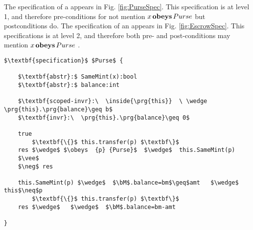
The specification of  a  appears in Fig. \ref{fig:PurseSpec}. This specification is at level 1, and therefore pre-conditions for not mention $x\, \textbf{obeys} \, Purse$ but postconditions do.
The specification of  an   appears in Fig. \ref{fig:EscrowSpec}. This specifications is at level 2, and therefore both pre- and post-conditions may mention  $x\, \textbf{obeys} \, Purse$ .

\newcommand{\sMT}{sellerM} 
\newcommand{\bMT}{buyerM}
\newcommand{\sGT}{sellerG} 
\newcommand{\bGT}{buyerG}
\newcommand{\sM}{\prg{\sMT}}
\newcommand{\bM}{\prg{\bMT}}
\newcommand{\sG}{\prg{\sGT}}
\newcommand{\bG}{\prg{\sGT}}

\begin{figure*}[t]
\begin{lstlisting}[mathescape=true, language=Chainmail, frame=lines]
$\textbf{specification}$ $Purse$ {
    
    $\textbf{abstr}:$ SameMint(x):bool
    $\textbf{abstr}:$ balance:int
    
    $\textbf{scoped-invr}:\  \inside{\prg{this}}  \ \wedge \prg{this}.\prg{balance}\geq b$
    $\textbf{invr}:\  \prg{this}.\prg{balance}\geq 0$       
     
    true  
        $\textbf{\{}$ this.transfer(p) $\textbf\}$
    res $\wedge$ $\obeys  {p} {Purse}$  $\wedge$  this.SameMint(p)
    $\vee$
    $\neg$ res

    this.SameMint(p) $\wedge$  $\bM$.balance=bm$\geq$amt   $\wedge$ this$\neq$p
        $\textbf{\{}$ this.transfer(p) $\textbf\}$
    res $\wedge$   $\wedge$  $\bM$.balance=bm-amt 
     
}

\end{lstlisting}
\caption{Specification of  $Purse$ -- Incomplete}
\label{fig:PurseSpec}
 \end{figure*}





